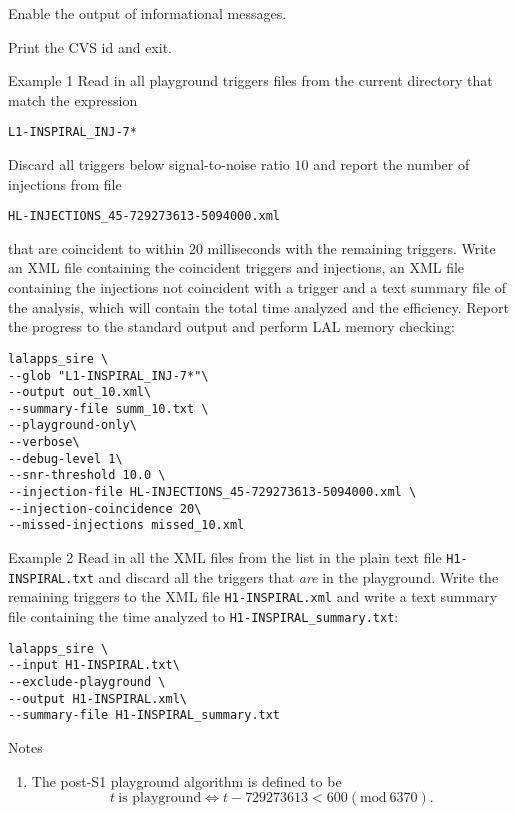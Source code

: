 \begin{entry}
\begin{entry}
\item[\option{--verbose}]
Enable the output of informational messages.

\item[\option{--version}]
Print the CVS id and exit.


\end{entry}

\item[Example 1] Read in all playground triggers files from the current
directory that match the expression 
\begin{verbatim}
L1-INSPIRAL_INJ-7*
\end{verbatim}
Discard all triggers below signal-to-noise ratio $10$ and report the number of
injections from file 
\begin{verbatim}
HL-INJECTIONS_45-729273613-5094000.xml
\end{verbatim}
that are coincident to within $20$ milliseconds with the remaining triggers.
Write an XML file containing the coincident triggers and injections, an XML
file containing the injections not coincident with a trigger and a text
summary file of the analysis, which will contain the total time analyzed and
the efficiency. Report the progress to the standard output and perform LAL
memory checking:
\begin{verbatim}
lalapps_sire \
--glob "L1-INSPIRAL_INJ-7*"\
--output out_10.xml\
--summary-file summ_10.txt \
--playground-only\
--verbose\
--debug-level 1\
--snr-threshold 10.0 \
--injection-file HL-INJECTIONS_45-729273613-5094000.xml \
--injection-coincidence 20\
--missed-injections missed_10.xml
\end{verbatim}

\item[Example 2] Read in all the XML files from the list in the plain text
file \verb$H1-INSPIRAL.txt$ and discard all the triggers that \emph{are} in
the playground. Write the remaining triggers to the XML file
\verb$H1-INSPIRAL.xml$ and write a text summary file containing the time
analyzed to \verb$H1-INSPIRAL_summary.txt$:
\begin{verbatim}
lalapps_sire \
--input H1-INSPIRAL.txt\ 
--exclude-playground \
--output H1-INSPIRAL.xml\ 
--summary-file H1-INSPIRAL_summary.txt
\end{verbatim}

\item[Notes]
\begin{enumerate}
\item The post-S1 playground algorithm is defined to be
\begin{equation}
t \ \textrm{is playground} \iff t - 729273613 < 600 (\textrm{mod}\ 6370).
\end{equation}


\end{enumerate}
\end{entry}
